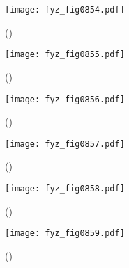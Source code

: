     \begin{figure}[ht!] %
      \centering
      \texttt{[image: fyz\_fig0854.pdf]}
      \caption{
               (\cite[s.~707]{Feynman02})}
      \label{fyz:fig0854}
    \end{figure}

    \begin{figure}[ht!] %
      \centering
      \texttt{[image: fyz\_fig0855.pdf]}
      \caption{
               (\cite[s.~707]{Feynman02})}
      \label{fyz:fig0855}
    \end{figure}

    \begin{figure}[ht!] %
      \centering
      \texttt{[image: fyz\_fig0856.pdf]}
      \caption{
               (\cite[s.~707]{Feynman02})}
      \label{fyz:fig0856}
    \end{figure}

    \begin{figure}[ht!] %
      \centering
      \texttt{[image: fyz\_fig0857.pdf]}
      \caption{
               (\cite[s.~707]{Feynman02})}
      \label{fyz:fig0857}
    \end{figure}

    \begin{figure}[ht!] %
      \centering
      \texttt{[image: fyz\_fig0858.pdf]}
      \caption{
               (\cite[s.~707]{Feynman02})}
      \label{fyz:fig0858}
    \end{figure}

    \begin{figure}[ht!] %
      \centering
      \texttt{[image: fyz\_fig0859.pdf]}
      \caption{
               (\cite[s.~707]{Feynman02})}
      \label{fyz:fig0859}
    \end{figure}


